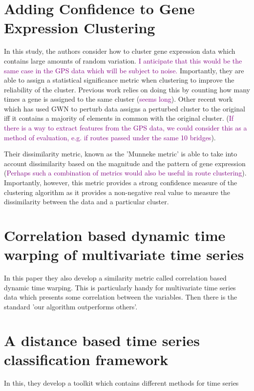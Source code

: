 \documentclass{article}
\newcommand\NOTE[1]{\textcolor{purple}{#1}}
\begin{document}
    \section{Adding Confidence to Gene Expression Clustering}

    In this study, the authors consider how to cluster gene expression data which contains large amounts of random variation. \NOTE{I anticipate that this would be the same case in the GPS data which will be subject to noise.} Importantly, they are able to assign a statistical significance metric when clustering to improve the reliability of the cluster. Previous work relies on doing this by counting how many times a gene is assigned to the same cluster (\NOTE{seems long}). Other recent work which has used GWN to perturb data assigns a perturbed cluster to the original iff it contains a majority of elements in common with the original cluster. (\NOTE{If there is a way to extract features from the GPS data, we could consider this as a method of evaluation, e.g. if routes passed under the same 10 bridges}). 

    Their dissimilarity metric, known as the 'Munneke metric' is able to take into account dissimilarity based on the magnitude and the pattern of gene expression (\NOTE{Perhaps such a combination of metrics would also be useful in route clustering}). Importantly, however, this metric provides a strong confidence measure of the clustering algorithm as it provides a non-negative real value to measure the dissimilarity between the data and a particular cluster.


    \section{Correlation based dynamic time warping of multivariate time series}

    In this paper they also develop a similarity metric called correlation based dynamic time warping. This is particularly handy for multivariate time series data which presents some correlation between the variables. Then there is the standard 'our algorithm outperforms others'.

    \section{A distance based time series classification framework}

    In this, they develop a toolkit which contains different methods for time series 
\end{document}
